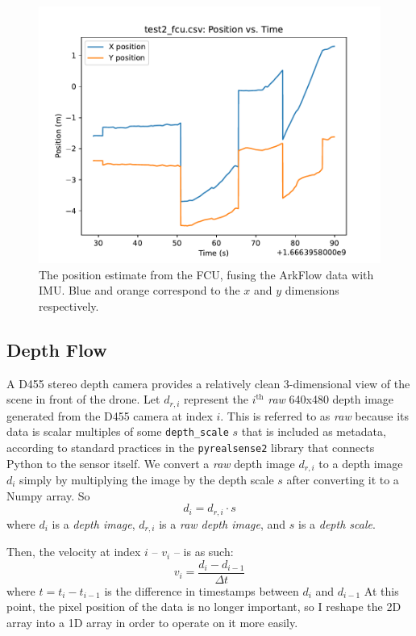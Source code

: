 \begin{figure}
	\centering
	\includegraphics[width=\linewidth]{./images/test2_fcu_position}
	\caption{The position estimate from the FCU, fusing the ArkFlow data with IMU. Blue and orange correspond to the $x$ and $y$ dimensions respectively.}
	\label{figure:arkflow_performance_position}
\end{figure}

\subsection{Depth Flow}

A D455 stereo depth camera provides a relatively clean 3-dimensional view of the scene
in front of the drone.
Let $d_{r,i}$ represent the $i^\mathrm{th}$ \emph{raw} 640x480 depth image
generated from the D455 camera at index $i$.
This is referred to as \emph{raw} because its data is scalar multiples of some \texttt{depth\_scale} $s$
that is included as metadata, according to standard practices in the \texttt{pyrealsense2} library
that connects Python to the sensor itself.
We convert a \emph{raw} depth image $d_{r,i}$ to a depth image $d_i$ simply by multiplying the image
by the depth scale $s$ after converting it to a Numpy array.
So
$$d_i = d_{r,i} \cdot s$$
where $d_i$ is a \emph{depth image},
$d_{r,i}$ is a \emph{raw depth image},
and $s$ is a \emph{depth scale}.

Then, the velocity at index $i$ -- $v_i$ -- is as such:
$$v_i = \dfrac{d_i - d_{i-1}}{\Delta t}$$
where $t=t_i-t_{i-1}$ is the difference in timestamps between $d_i$ and $d_{i-1}$
At this point, the pixel position of the data is no longer important,
so I reshape the 2D array into a 1D array in order to operate on it more easily.

